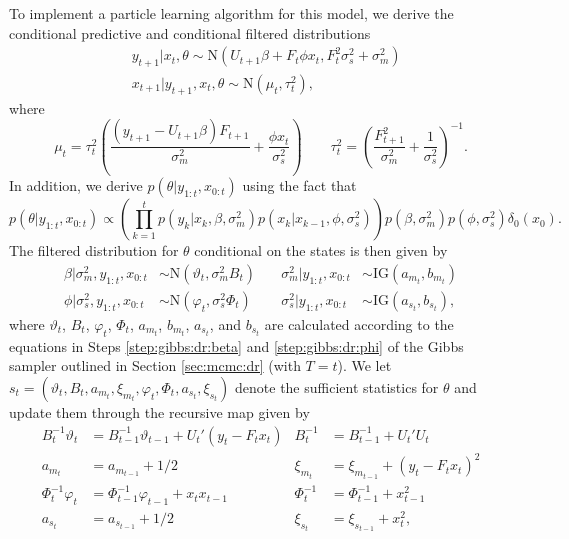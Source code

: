 To implement a particle learning algorithm for this model, we derive the conditional predictive and conditional filtered distributions
\begin{align}
&y_{t+1}|x_t,\theta \sim \mbox{N}(U_{t+1}\beta + F_t\phi x_t, F_t^2\sigma^2_s + \sigma^2_m) \label{eqn:pl:dr:pred} \\
&x_{t+1}|y_{t+1},x_t,\theta \sim \mbox{N}(\mu_t,\tau_t^2), \label{eqn:pl:dr:state}
\end{align}
where \[\mu_t = \tau_t^2\left(\frac{(y_{t+1}-U_{t+1}\beta)F_{t+1}}{\sigma^2_m} + \frac{\phi x_t}{\sigma^2_s}\right) \qquad \tau_t^2 = \left(\frac{F_{t+1}^2}{\sigma^2_m} + \frac{1}{\sigma^2_s}\right)^{-1}.\]
In addition, we derive $p(\theta|y_{1:t},x_{0:t})$ using the fact that
\begin{equation}
p(\theta|y_{1:t},x_{0:t}) \propto \left(\prod_{k=1}^t p(y_k|x_k,\beta,\sigma^2_m)p(x_k|x_{k-1},\phi,\sigma^2_s)\right)p(\beta,\sigma^2_m)p(\phi,\sigma^2_s)\delta_0(x_0). \label{eqn:pl:dr:theta}
\end{equation}
The filtered distribution for $\theta$ conditional on the states is then given by
\begin{align}
\beta|\sigma^2_m,y_{1:t},x_{0:t} &\sim \mbox{N}(\vartheta_t, \sigma^2_m B_t) &\quad \sigma^2_m|y_{1:t},x_{0:t} &\sim \mbox{IG}(a_{m_t},b_{m_t}) \label{eqn:pl:post:beta} \\
\phi|\sigma^2_s,y_{1:t},x_{0:t} &\sim \mbox{N}(\varphi_t, \sigma^2_s \Phi_t) &\quad \sigma^2_s|y_{1:t},x_{0:t} &\sim \mbox{IG}(a_{s_t},b_{s_t}), \label{eqn:pl:post:phi}
\end{align}
where $\vartheta_t$, $B_t$, $\varphi_t$, $\Phi_t$, $a_{m_t}$, $b_{m_t}$, $a_{s_t}$, and $b_{s_t}$ are calculated according to the equations in Steps \ref{step:gibbs:dr:beta} and \ref{step:gibbs:dr:phi} of the Gibbs sampler outlined in Section \ref{sec:mcmc:dr} (with $T = t$). We let $s_t = (\vartheta_t, B_t, a_{m_t}, \xi_{m_t}, \varphi_t, \Phi_t, a_{s_t}, \xi_{s_t})$ denote the sufficient statistics for $\theta$ and update them through the recursive map given by
\begin{align}
B_t^{-1}\vartheta_t &= B_{t-1}^{-1}\vartheta_{t-1} + U_t'(y_t - F_tx_t) & B_t^{-1} &= B_{t-1}^{-1} + U_t'U_t \label{eqn:pl:dr:suff} \\
a_{m_t} &= a_{m_{t-1}} + 1/2 & \xi_{m_t} &= \xi_{m_{t-1}} + (y_t - F_tx_t)^2 \nonumber \\
\Phi_t^{-1}\varphi_t &= \Phi_{t-1}^{-1}\varphi_{t-1} + x_tx_{t-1} & \Phi_t^{-1} &= \Phi_{t-1}^{-1} + x_{t-1}^2 \nonumber \\
a_{s_t} &= a_{s_{t-1}} + 1/2 & \xi_{s_t} &= \xi_{s_{t-1}} + x_t^2, \nonumber
\end{align}
